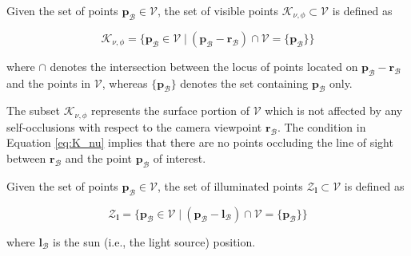 \begin{definition}
\label{def:K}
    Given the set of points $\mathbf{p}_\mathcal{B}\in\mathcal{V}$, the set of visible points $\mathcal{K}_{\nu,\phi}\subset \mathcal{V}$ is defined as

    \begin{equation}
    \label{eq:K_nu}
        \mathcal{K}_{\nu,\phi} = \{ \mathbf{p}_\mathcal{B}\in\mathcal{V} \; | \: (\mathbf{p}_\mathcal{B}-\mathbf{r}_\mathcal{B}) \cap \mathcal{V} = \{ \mathbf{p}_\mathcal{B} \} \}
    \end{equation}

    where $\cap$ denotes the intersection between the locus of points located on  $\mathbf{p}_\mathcal{B}-\mathbf{r}_\mathcal{B}$ and the points in $\mathcal{V}$, whereas $\{\mathbf{p}_\mathcal{B}\}$ denotes the set containing $\mathbf{p}_\mathcal{B}$ only.
\end{definition}

The subset $\mathcal{K}_{\nu,\phi}$ represents the surface portion of $\mathcal{V}$ which is not affected by any self-occlusions with respect to the camera viewpoint $\mathbf{r}_\mathcal{B}$. The condition in Equation \ref{eq:K_nu} implies that there are no points occluding the line of sight between $\mathbf{r}_\mathcal{B}$ and the point $\mathbf{p}_\mathcal{B}$ of interest.

\begin{definition}
\label{def:L}
    Given the set of points $\mathbf{p}_\mathcal{B}\in\mathcal{V}$, the set of illuminated points $\mathcal{Z}_\mathbf{l}\subset \mathcal{V}$ is defined as

    \begin{equation}
        \mathcal{Z}_\mathbf{l} = \{ \mathbf{p}_\mathcal{B}\in\mathcal{V} \; | \: (\mathbf{p}_\mathcal{B} - \mathbf{l}_\mathcal{B}) \cap \mathcal{V} = \{ \mathbf{p_\mathcal{B}}\} \}
    \end{equation}

    where $\mathbf{l}_\mathcal{B}$ is the sun (i.e., the light source) position.
\end{definition}

